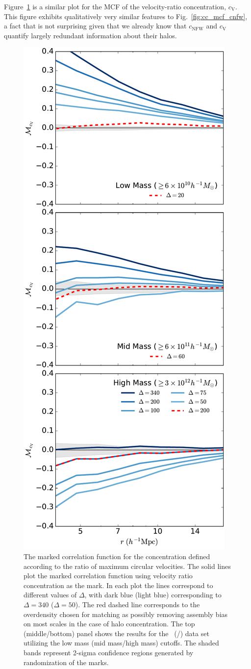 \documentclass[usenatbib,fleqn]{mnras}
\begin{document}
Figure~\ref{fig:cc_mcf_cV} is a similar plot for the MCF of the velocity-ratio concentration, $c_{\mathrm{V}}$. 
This figure exhibits qualitatively very similar features to Fig.~\ref{fig:cc_mcf_cnfw}, a 
fact that is not surprising given that we already know that $c_{\mathrm{NFW}}$ and $c_{\mathrm{V}}$ 
quantify largely redundant information about their halos.

\begin{figure}
	\centering
	\includegraphics[width=.4\textwidth]{all_mcf_cV.pdf}
	\caption{	
The marked correlation function for the concentration defined according to the ratio of maximum circular velocities. The solid lines plot the marked correlation function using velocity ratio concentration as the mark. In each plot the lines correspond to different values of $\Delta$, with dark blue (light blue) corresponding to $\Delta = 340$ ($\Delta = 50$). The red dashed line corresponds to the overdensity chosen for matching as possibly removing assembly bias on most scales in the case of halo concentration. The top (middle/bottom) panel shows the results for the
\simA \ (\simB /\simC) data set utilizing the low mass (mid mass/high mass) cutoffs. The shaded bands represent 2-sigma confidence regions generated by randomization of the marks. 
}
	\label{fig:cc_mcf_cV}
\end{figure}
\end{document}
